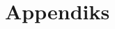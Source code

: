 \documentclass[hidelinks, openany, 12pt, a4paper]{book}
\begin{document}
\part{Appendiks}




%
%
%
%
%
% 
% 
% 
\end{document}
